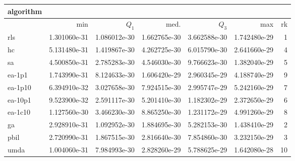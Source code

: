 \begin{tabular}{@{}l*{5}{>{{}}N{1}{1}}>{{}}N{2}{0}@{}}
\toprule
{algorithm} &  \\
\midrule
& {min} & {$Q_1$} & {med.} & {$Q_3$} & {max} & {rk}\\
\midrule
rls & 1.301060e-31 & {\color{blue}} 1.086012e-30 & {\color{blue}} 1.662765e-30 & {\color{blue}} 3.662588e-30 & 1.742480e-29 & 1\\
hc & 5.131480e-31 & 1.419867e-30 & 4.262725e-30 & 6.015790e-30 & 2.641660e-29 & 4\\
sa & 4.500850e-31 & 2.785283e-30 & 4.546030e-30 & 9.766623e-30 & {\color{blue}} 1.382040e-29 & 5\\
ea-1p1 & 1.743990e-31 & 8.124633e-30 & 1.606420e-29 & 2.960345e-29 & 4.188740e-29 & 9\\
ea-1p10 & {\color{blue}} 6.394910e-32 & 3.027658e-30 & 7.924515e-30 & 2.995747e-29 & 5.242160e-29 & 7\\
ea-10p1 & 9.523900e-32 & 2.591117e-30 & 5.201410e-30 & 1.182302e-29 & 2.372650e-29 & 6\\
ea-1c10 & 1.127560e-30 & 3.466230e-30 & 8.865250e-30 & 1.231172e-29 & 4.991260e-29 & 8\\
ga & 2.928910e-31 & 1.092952e-30 & 1.884695e-30 & 5.282153e-30 & 1.438410e-29 & 2\\
pbil & 2.720990e-31 & 1.867515e-30 & 2.816640e-30 & 7.854860e-30 & 3.232150e-29 & 3\\
umda & 1.004060e-31 & 7.984993e-30 & 2.828260e-29 & 5.788625e-29 & 1.642080e-28 & 10\\
\bottomrule
\end{tabular}
